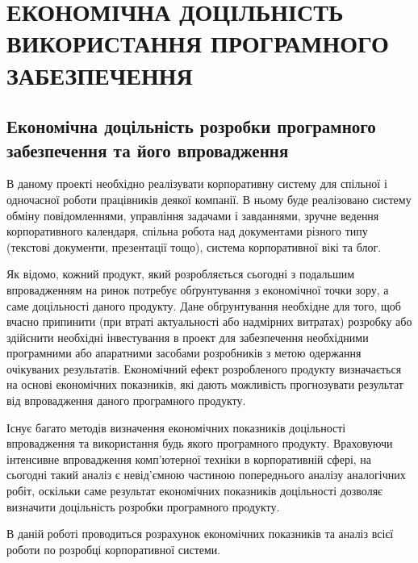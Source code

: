 \section{ЕКОНОМІЧНА ДОЦІЛЬНІСТЬ ВИКОРИСТАННЯ ПРОГРАМНОГО ЗАБЕЗПЕЧЕННЯ}

\subsection{Економічна доцільність розробки програмного забезпечення та його впровадження}

В даному проекті необхідно реалізувати корпоративну систему для спільної і одночасної роботи працівників деякої компанії. В ньому буде реалізовано систему обміну повідомленнями, управління задачами і завданнями, зручне ведення корпоративного календаря, спільна робота над документами різного типу (текстові документи, презентації тощо), система корпоративної вікі та блог. 
\par Як відомо, кожний продукт, який розробляється сьогодні з подальшим впровадженням на ринок потребує обґрунтування з економічної точки зору, а саме доцільності даного продукту. Дане обґрунтування необхідне для того, щоб вчасно припинити (при втраті актуальності або надмірних витратах) розробку або здійснити необхідні інвестування в проект для забезпечення необхідними програмними або апаратними засобами розробників з метою одержання очікуваних результатів. Економічний ефект розробленого продукту визначається на основі економічних показників, які дають можливість прогнозувати результат від впровадження даного програмного продукту.
\par Існує багато методів визначення економічних показників доцільності впровадження та використання будь якого програмного продукту. Враховуючи інтенсивне впровадження комп’ютерної техніки в корпоративній сфері, на сьогодні такий аналіз є невід’ємною частиною попереднього аналізу аналогічних робіт, оскільки саме результат економічних показників доцільності дозволяє визначити доцільність розробки програмного продукту.
\par В даній роботі проводиться розрахунок економічних показників та аналіз всієї роботи по розробці корпоративної системи.

